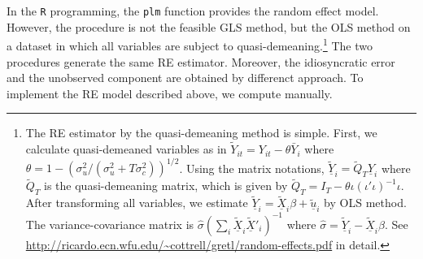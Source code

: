 \documentclass[
  12pt,
]{article}
\begin{document}
In the \texttt{R} programming,
the \texttt{plm} function provides the random effect model.
However, the procedure is not the feasible GLS method,
but the OLS method on a dataset in which all variables are subject to quasi-demeaning.\footnote{The RE estimator by the quasi-demeaning method is simple. First, we calculate quasi-demeaned variables as in \(\tilde{Y}_{it} = Y_{it} - \theta \bar{Y}_i\) where \(\theta = 1 - (\sigma_u^2/(\sigma_u^2 + T \sigma_c^2))^{1/2}\). Using the matrix notations, \(\tilde{\underline{Y}}_i = \tilde{Q}_T \underline{Y}_i\) where \(\tilde{Q}_T\) is the quasi-demeaning matrix, which is given by \(\tilde{Q}_T = I_T - \theta \iota (\iota' \iota)^{-1} \iota\). After transforming all variables, we estimate \(\tilde{\underline{Y}}_i = \tilde{\underline{X}}_i \beta + \tilde{\underline{u}}_i\) by OLS method. The variance-covariance matrix is \(\hat{\sigma} (\sum_i \tilde{\underline{X}}_i \tilde{\underline{X}}'_i)^{-1}\) where \(\hat{\sigma} = \tilde{\underline{Y}}_i - \tilde{\underline{X}}_i \hat{\beta}\). See \url{http://ricardo.ecn.wfu.edu/~cottrell/gretl/random-effects.pdf} in detail.}
The two procedures generate the same RE estimator.
Moreover, the idiosyncratic error and the unobserved component are obtained by differenct approach.
To implement the RE model described above, we compute manually.
\end{document}
